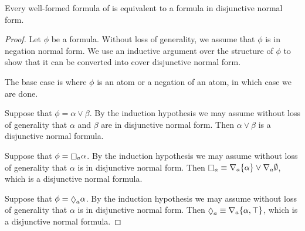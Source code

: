 \begin{lemma}\label{k-dnf}
Every well-formed formula of \logicK{} is equivalent to a formula in disjunctive
normal form.
\end{lemma}

\begin{proof}
Let $\phi$ be a \logicK{} formula. Without loss of generality, we assume that
$\phi$ is in negation normal form. We use an inductive argument over the
structure of $\phi$ to show that it can be converted into cover disjunctive
normal form.

The base case is where $\phi$ is an atom or a negation of an atom, in which case
we are done.

Suppose that $\phi = \alpha \lor \beta$. By the induction hypothesis we
may assume without loss of generality that $\alpha$ and $\beta$ are in
disjunctive normal form. Then $\alpha \lor \beta$ is a disjunctive normal
formula.

Suppose that $\phi = \knows_a \alpha$. By the induction hypothesis we may
assume without loss of generality that $\alpha$ is in disjunctive normal form.
Then $\knows_a \equiv \covers_a \{\alpha\} \lor \covers_a \emptyset$, which is
a disjunctive normal formula.

Suppose that $\phi = \suspects_a \alpha$. By the induction hypothesis we may
assume without loss of generality that $\alpha$ is in disjunctive normal form.
Then $\suspects_a \equiv \covers_a \{\alpha, \top\}$, which is a disjunctive
normal formula.


\end{proof}
